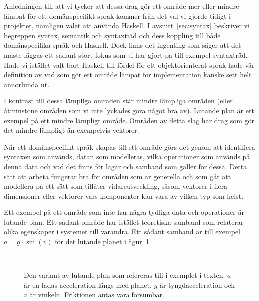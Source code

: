 Anledningen till att vi tycker att dessa drag gör ett område mer eller
mindre lämpat för ett domänspecifikt språk kommer från det val vi gjorde tidigt
i projektet, nämligen valet att använda Haskell. I avsnitt~\ref{sec:syntax}
beskriver vi begreppen syntax, semantik och syntaxträd och dess koppling till
både domänspecifika språk och Haskell. Dock finns det ingenting som säger att
det måste läggas ett sådant stort fokus som vi har gjort på till exempel syntaxträd. Hade
vi istället valt bort Haskell till fördel för ett objektorienterat språk hade vår definition av vad som gör ett område lämpat för
implementation kanske sett helt annorlunda ut.

I kontrast till dessa lämpliga områden står mindre lämpliga områden (eller
åtminstone områden som vi inte lyckades göra något bra av). Lutande plan är ett exempel på ett mindre lämpligt område. Områden av detta slag har drag som gör det mindre lämpligt än exempelvis vektorer.

När ett domänspecifikt språk skapas till ett område görs det genom att
identifiera syntaxen som används, datan som modelleras,
vilka operationer som används på denna data och vad det finns för lagar och samband
som gäller för dessa. Detta sätt att arbeta fungerar bra för områden som är
generella och som går att modellera på ett sätt som tillåter vidareutveckling, såsom
vektorer i flera dimensioner eller vektorer vars komponenter kan vara av vilken
typ som helst.

Ett exempel på ett område som inte har några tydliga data och operationer är
lutande plan. Ett sådant område har istället teoretiska samband som relaterar
olika egenskaper i systemet till varandra. Ett sådant samband är till exempel $a
= g \cdot \sin(v)$ för det lutande planet i figur~\ref{fig:lutande_plan}.

\begin{figure}[tph]
  \centering
  \caption{Den variant av lutande plan som refereras till i exemplet i texten. $a$
  är en lådas acceleration längs med planet, $g$ är tyngdacceleration och $v$ är
  vinkeln. Friktionen antas vara försumbar.}~\label{fig:lutande_plan}
\end{figure}

